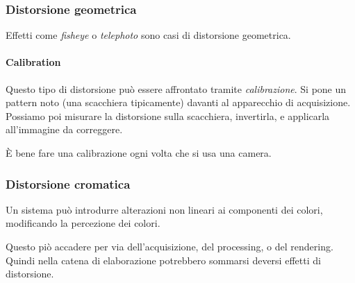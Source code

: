 \documentclass{article}
\begin{document}
\subsubsection{Distorsione geometrica}
Effetti come \textit{fisheye} o \textit{telephoto} sono casi di distorsione geometrica. 

\paragraph{Calibration}
Questo tipo di distorsione può essere affrontato tramite \textit{calibrazione}.
Si pone un pattern noto (una scacchiera tipicamente) davanti al apparecchio di acquisizione. Possiamo poi misurare la distorsione sulla scacchiera, invertirla, e applicarla all'immagine da correggere.

È bene fare una calibrazione ogni volta che si usa una camera.

\subsubsection{Distorsione cromatica}
Un sistema può introdurre alterazioni non lineari ai componenti dei colori, modificando la percezione dei colori.

Questo piò accadere per via dell'acquisizione, del processing, o del rendering. Quindi nella catena di elaborazione potrebbero sommarsi deversi effetti di distorsione.
\end{document}
